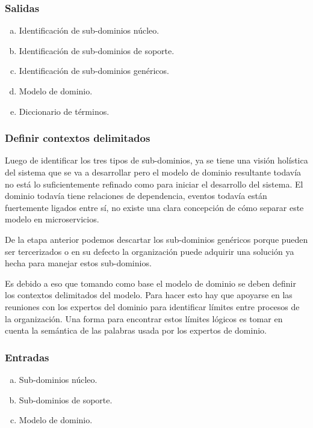 \subsubsection*{Salidas}
\begin{enumerate}[a.]
    \item Identificación de sub-dominios núcleo.
    \item Identificación de sub-dominios de soporte.
    \item Identificación de sub-dominios genéricos.
    \item Modelo de dominio.
    \item Diccionario de términos.
\end{enumerate}


\subsubsection{Definir contextos delimitados}
Luego de identificar los tres tipos de sub-dominios, ya se tiene una visión holística
del sistema que se va a desarrollar pero el modelo de dominio resultante todavía no está
lo suficientemente refinado como para iniciar el desarrollo del sistema.
El dominio todavía tiene relaciones de dependencia, eventos todavía están fuertemente ligados
entre sí, no existe una clara concepción de cómo separar este modelo en microservicios.

De la etapa anterior podemos descartar los sub-dominios genéricos porque pueden ser tercerizados
o en su defecto la organización puede adquirir una solución ya hecha para manejar estos sub-dominios.

Es debido a eso que tomando como base el modelo de dominio se deben definir los contextos delimitados
del modelo.
Para hacer esto hay que apoyarse en las reuniones con los expertos del dominio para identificar
límites entre procesos de la organización.
Una forma para encontrar estos límites lógicos es tomar en cuenta la semántica de las palabras usada por los 
expertos de dominio.

\subsubsection*{Entradas}
\begin{enumerate}[a.]
	\item Sub-dominios núcleo.
	\item Sub-dominios de soporte.
	\item Modelo de dominio.
\end{enumerate}

